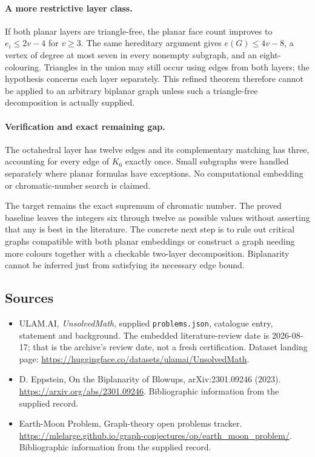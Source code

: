 \documentclass[11pt,a4paper]{article}
\begin{document}
\paragraph{A more restrictive layer class.}
If both planar layers are triangle-free, the planar face count improves to $e_i\le2v-4$ for $v\ge3$. The same hereditary argument gives $e(G)\le4v-8$, a vertex of degree at most seven in every nonempty subgraph, and an eight-colouring. Triangles in the union may still occur using edges from both layers; the hypothesis concerns each layer separately. This refined theorem therefore cannot be applied to an arbitrary biplanar graph unless such a triangle-free decomposition is actually supplied.

\paragraph{Verification and exact remaining gap.}
The octahedral layer has twelve edges and its complementary matching has three, accounting for every edge of $K_6$ exactly once. Small subgraphs were handled separately where planar formulas have exceptions. No computational embedding or chromatic-number search is claimed.

The target remains the exact supremum of chromatic number. The proved baseline leaves the integers six through twelve as possible values without asserting that any is best in the literature. The concrete next step is to rule out critical graphs compatible with both planar embeddings or construct a graph needing more colours together with a checkable two-layer decomposition. Biplanarity cannot be inferred just from satisfying its necessary edge bound.

\subsection{Sources}

{\small

\begin{itemize}

\item[\hypertarget{source:statement:1}{S1}] ULAM.AI, \emph{UnsolvedMath}, supplied \texttt{problems.json}, catalogue entry, statement and background. The embedded literature-review date is 2026-08-17; that is the archive’s review date, not a fresh certification. Dataset landing page: \url{https://huggingface.co/datasets/ulamai/UnsolvedMath}.

\item[\hypertarget{source:statement:2}{S2}] D. Eppstein, On the Biplanarity of Blowups, arXiv:2301.09246 (2023). \url{https://arxiv.org/abs/2301.09246}. Bibliographic information from the supplied record.

\item[\hypertarget{source:statement:3}{S3}] Earth-Moon Problem, Graph-theory open problems tracker. \url{https://mlelarge.github.io/graph-conjectures/op/earth_moon_problem/}. Bibliographic information from the supplied record.

\end{itemize}

}

\label{end:statement}
\end{document}
